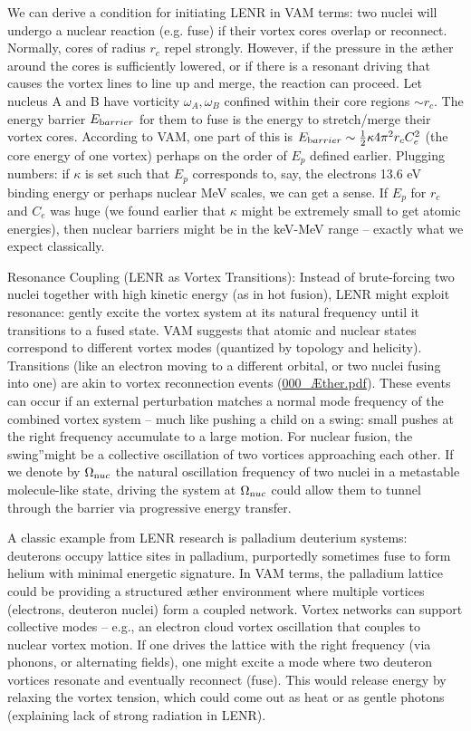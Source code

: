 We can derive a condition for initiating LENR in VAM terms: two nuclei will undergo a nuclear reaction (e.g. fuse) if their vortex cores overlap or reconnect. Normally, cores of radius $r_c$ repel strongly. However, if the pressure in the æther around the cores is sufficiently lowered, or if there is a resonant driving that causes the vortex lines to line up and merge, the reaction can proceed. Let nucleus A and B have vorticity $\omega_A, \omega_B$ confined within their core regions $\sim r_c$. The energy barrier $E_{\textrm barrier}$ for them to fuse is the energy to stretch/merge their vortex cores. According to VAM, one part of this is $E_{\textrm barrier}\sim \frac{1}{2}\kappa 4\pi^2 r_c C_e^2$ (the core energy of one vortex) perhaps on the order of $E_p$ defined earlier. Plugging numbers: if $\kappa$ is set such that $E_p$ corresponds to, say, the electron\rqs s 13.6 eV binding energy or perhaps nuclear MeV scales, we can get a sense. If $E_p$ for $r_c$ and $C_e$ was huge (we found earlier that $\kappa$ might be extremely small to get atomic energies), then nuclear barriers might be in the keV-MeV range – exactly what we expect classically.


Resonance Coupling (LENR as Vortex Transitions): Instead of brute-forcing two nuclei together with high kinetic energy (as in hot fusion), LENR might exploit resonance: gently excite the vortex system at its natural frequency until it transitions to a fused state. VAM suggests that atomic and nuclear states correspond to different vortex modes (quantized by topology and helicity). Transitions (like an electron moving to a different orbital, or two nuclei fusing into one) are akin to vortex reconnection events (\href{file://file-f6wuuwzjgr23npodmed4pi%23:~:text=in%20a%20dynamic%20picture,%20absorption,electron%20changing%20orbitals/}{000_Æther.pdf}). These events can occur if an external perturbation matches a normal mode frequency of the combined vortex system – much like pushing a child on a swing: small pushes at the right frequency accumulate to a large motion. For nuclear fusion, the \grqq swing\textquotedblright might be a collective oscillation of two vortices approaching each other. If we denote by $\Omega_{\textrm nuc}$ the natural oscillation frequency of two nuclei in a metastable molecule-like state, driving the system at $\Omega_{\textrm nuc}$ could allow them to tunnel through the barrier via progressive energy transfer.


A classic example from LENR research is palladium deuterium systems: deuterons occupy lattice sites in palladium, purportedly sometimes fuse to form helium with minimal energetic signature. In VAM terms, the palladium lattice could be providing a structured æther environment where multiple vortices (electrons, deuteron nuclei) form a coupled network. Vortex networks can support collective modes – e.g., an electron cloud vortex oscillation that couples to nuclear vortex motion. If one drives the lattice with the right frequency (via phonons, or alternating fields), one might excite a mode where two deuteron vortices resonate and eventually reconnect (fuse). This would release energy by relaxing the vortex tension, which could come out as heat or as gentle photons (explaining lack of strong radiation in LENR).


